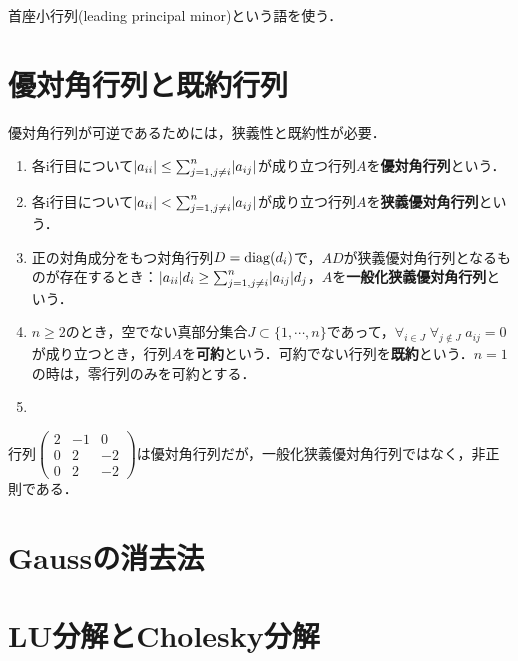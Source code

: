 \documentclass[uplatex, dvipdfmx]{jsreport}
\begin{document}
首座小行列(leading principal minor)という語を使う．

\section{優対角行列と既約行列}

\begin{tcolorbox}[colframe=ForestGreen, colback=ForestGreen!10!white,breakable,colbacktitle=ForestGreen!40!white,coltitle=black,fonttitle=\bfseries\sffamily,
title=]
    優対角行列が可逆であるためには，狭義性と既約性が必要．
\end{tcolorbox}

\begin{definition}
    \begin{enumerate}
        \item 各i行目について$\lvert a_{ii}\rvert\le\sum^n_{j=1,j\ne i}\lvert a_{ij}\rvert$が成り立つ行列$A$を\textbf{優対角行列}という．
        \item 各i行目について$\lvert a_{ii}\rvert<\sum^n_{j=1,j\ne i}\lvert a_{ij}\rvert$が成り立つ行列$A$を\textbf{狭義優対角行列}という．
        \item 正の対角成分をもつ対角行列$D=\mathrm{diag}(d_i)$で，$AD$が狭義優対角行列となるものが存在するとき：$\lvert a_{ii}\rvert d_i\ge\sum^n_{j=1,j\ne i}\lvert a_{ij}\rvert d_j$，$A$を\textbf{一般化狭義優対角行列}という．
        \item $n\ge 2$のとき，空でない真部分集合$J\subset\{1,\cdots,n\}$であって，$\forall_{i\in J}\;\forall_{j\notin J}\;a_{ij}=0$が成り立つとき，行列$A$を\textbf{可約}という．可約でない行列を\textbf{既約}という．$n=1$の時は，零行列のみを可約とする．
        \item 
    \end{enumerate}
\end{definition}

\begin{example}
    行列$\begin{pmatrix}2&-1&0\\0&2&-2\\0&2&-2\end{pmatrix}$は優対角行列だが，一般化狭義優対角行列ではなく，非正則である．
\end{example}

\section{Gaussの消去法}

\section{LU分解とCholesky分解}
\end{document}
